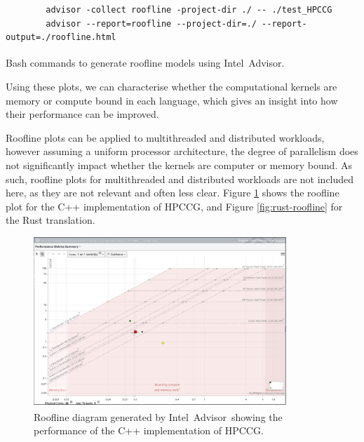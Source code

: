 \begin{listing}[H]
    \begin{verbatim}
        advisor -collect roofline -project-dir ./ -- ./test_HPCCG
        advisor --report=roofline --project-dir=./ --report-output=./roofline.html
    \end{verbatim}
    \caption{Bash commands to generate roofline models using Intel\textsuperscript{\textregistered}\ Advisor.}
    \label{listing:roofline-generation}
\end{listing}

Using these plots, we can characterise whether the computational kernels are memory or compute bound in each language, which gives an insight into how their performance can be improved.

Roofline plots can be applied to multithreaded and distributed workloads, however assuming a uniform processor architecture, the degree of parallelism does not significantly impact whether the kernels are computer or memory bound. As such, roofline plots for multithreaded and distributed workloads are not included here, as they are not relevant and often less clear. Figure \ref{fig:cpp-roofline} shows the roofline plot for the C++ implementation of \acrshort{HPCCG}, and Figure \ref{fig:rust-roofline} for the Rust translation.

\begin{figure}[H]
    \centering
    \includegraphics[width=0.85\textwidth]{images/5_performance/rooflines/cpp_roofline.png}
    \caption{Roofline diagram generated by Intel\textsuperscript{\textregistered}\ Advisor\ showing the performance of the C++ implementation of \acrshort{HPCCG}.}
    \label{fig:cpp-roofline}
\end{figure}

